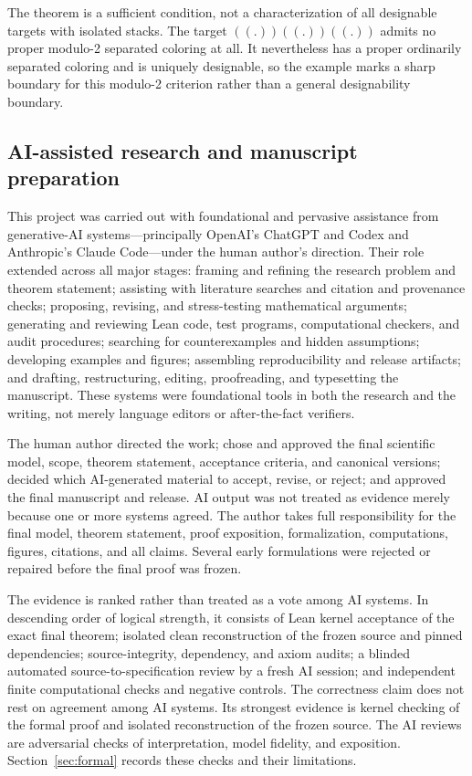 \documentclass[11pt]{article}
\begin{document}
The theorem is a sufficient condition, not a characterization of all designable targets with isolated stacks.  The target $((.))((.))((.))$ admits no proper modulo-2 separated coloring at all.  It nevertheless has a proper ordinarily separated coloring and is uniquely designable, so the example marks a sharp boundary for this modulo-2 criterion rather than a general designability boundary.

\subsection{AI-assisted research and manuscript preparation}
\label{sec:ai-disclosure}

This project was carried out with foundational and pervasive assistance from generative-AI systems---principally OpenAI's ChatGPT and Codex and Anthropic's Claude Code---under the human author's direction.  Their role extended across all major stages: framing and refining the research problem and theorem statement; assisting with literature searches and citation and provenance checks; proposing, revising, and stress-testing mathematical arguments; generating and reviewing Lean code, test programs, computational checkers, and audit procedures; searching for counterexamples and hidden assumptions; developing examples and figures; assembling reproducibility and release artifacts; and drafting, restructuring, editing, proofreading, and typesetting the manuscript.  These systems were foundational tools in both the research and the writing, not merely language editors or after-the-fact verifiers.

The human author directed the work; chose and approved the final scientific model, scope, theorem statement, acceptance criteria, and canonical versions; decided which AI-generated material to accept, revise, or reject; and approved the final manuscript and release.  AI output was not treated as evidence merely because one or more systems agreed.  The author takes full responsibility for the final model, theorem statement, proof exposition, formalization, computations, figures, citations, and all claims.  Several early formulations were rejected or repaired before the final proof was frozen.

The evidence is ranked rather than treated as a vote among AI systems.  In descending order of logical strength, it consists of Lean kernel acceptance of the exact final theorem; isolated clean reconstruction of the frozen source and pinned dependencies; source-integrity, dependency, and axiom audits; a blinded automated source-to-specification review by a fresh AI session; and independent finite computational checks and negative controls.  The correctness claim does not rest on agreement among AI systems.  Its strongest evidence is kernel checking of the formal proof and isolated reconstruction of the frozen source.  The AI reviews are adversarial checks of interpretation, model fidelity, and exposition.  Section~\ref{sec:formal} records these checks and their limitations.
\end{document}
